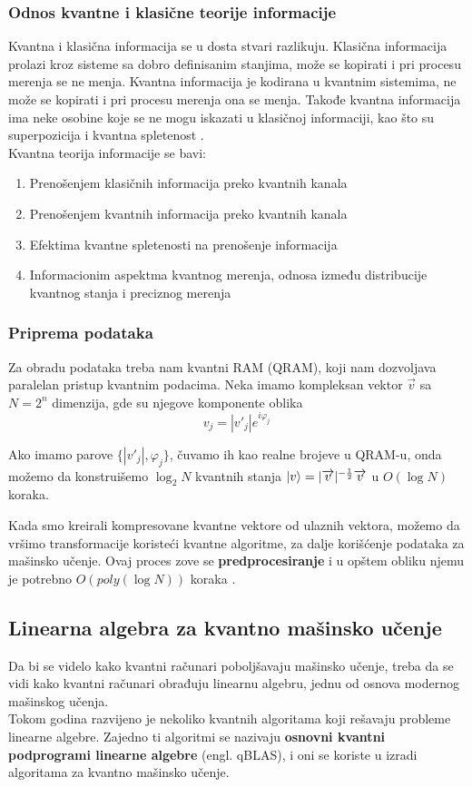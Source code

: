 \documentclass[12pt, letterpaper, oneside]{article}
\begin{document}
\subsubsection*{Odnos kvantne i klasične teorije informacije}
Kvantna i klasična informacija se u dosta stvari razlikuju.  Klasična informacija prolazi kroz sisteme sa dobro definisanim stanjima, može se kopirati i pri procesu merenja se ne menja.
Kvantna informacija je kodirana u kvantnim sistemima, ne može se kopirati i pri procesu merenja ona se menja. Takođe kvantna informacija ima neke osobine koje se ne
mogu iskazati u klasičnoj informaciji, kao što su superpozicija i kvantna spletenost \cite{Classical&quantum_info}. \\
Kvantna teorija informacije se bavi: 
\begin{enumerate}
    \item Prenošenjem klasičnih informacija preko kvantnih kanala
    \item Prenošenjem kvantnih informacija preko kvantnih kanala
    \item Efektima kvantne spletenosti na prenošenje informacija
    \item Informacionim aspektma kvantnog merenja, odnosa između distribucije \\
    kvantnog stanja i preciznog merenja
\end{enumerate}
\subsubsection{Priprema podataka}
Za obradu podataka treba nam kvantni RAM (QRAM), koji nam dozvoljava paralelan pristup kvantnim podacima.
Neka imamo kompleksan vektor $\overrightarrow{v}$ sa $N=2^n$ dimenzija, gde su njegove komponente oblika 
\[
    v_j = |v'_j|e^{i\varphi_j}
\]

Ako imamo parove $\{|v'_j|,\varphi_j\}$, čuvamo ih kao realne brojeve u QRAM-u, onda možemo da konstruišemo
$\log_{2}N$ kvantnih stanja $\ket{v} = |\overrightarrow{v}|^{-\frac{1}{2}}\overrightarrow{v}$ u $O(\log N)$ koraka.

Kada smo kreirali kompresovane kvantne vektore od ulaznih vektora, možemo da vršimo transformacije koristeći kvantne algoritme, za dalje korišćenje podataka za mašinsko učenje.
Ovaj proces zove se \textbf{predprocesiranje} i u opštem obliku njemu je potrebno $O(poly(\log{}N))$ koraka \cite{lloyd2013quantum}.

\subsection{Linearna algebra za kvantno mašinsko učenje}
Da bi se videlo kako kvantni računari poboljšavaju mašinsko učenje, treba da se vidi kako kvantni računari obrađuju linearnu algebru, jednu od osnova modernog mašinskog učenja. \\
Tokom godina razvijeno je nekoliko kvantnih algoritama koji rešavaju probleme linearne algebre.
Zajedno ti algoritmi se nazivaju \textbf{osnovni kvantni podprogrami linearne algebre} (engl. qBLAS), i oni se koriste u izradi algoritama za kvantno mašinsko učenje.
\end{document}
